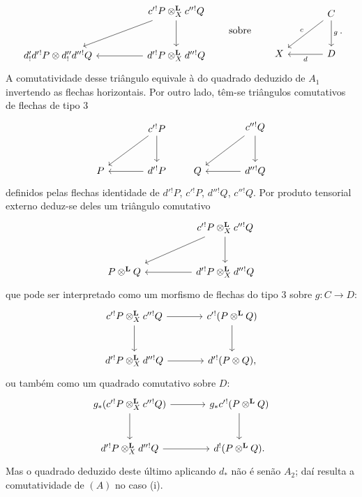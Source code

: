 \begin{prooftext}[Demonstração]
\[\begin{tikzcd}[column sep=huge,row sep=large]
& c'{}^!P\otimes_X^{\mathbf L}c''{}^!Q \arrow[d] \arrow[dl]\\
d'_!d'{}^!P\otimes d''_!d''{}^!Q &
d'{}^!P\otimes_X^{\mathbf L}d''{}^!Q\arrow[l]
\end{tikzcd}
\qquad\text{sobre}\qquad
\begin{tikzcd}[column sep=large,row sep=large]
& C\arrow[d,"g"]\arrow[dl,"c"']\\
X & D\arrow[l,"d"]
\end{tikzcd}.
\]
A comutatividade desse triângulo equivale à do quadrado deduzido de $A_1$ invertendo as flechas horizontais. Por outro lado, têm-se triângulos comutativos de flechas de tipo $3$
\[
\begin{tikzcd}[column sep=large,row sep=large]
& c'{}^!P \arrow[d]\arrow[dl]\\
P & d'{}^!P\arrow[l]
\end{tikzcd}
\qquad
\begin{tikzcd}[column sep=large,row sep=large]
& c''{}^!Q \arrow[d]\arrow[dl]\\
Q & d''{}^!Q\arrow[l]
\end{tikzcd}
\]
definidos pelas flechas identidade de $d'{}^!P$, $c'{}^!P$, $d''{}^!Q$, $c''{}^!Q$. Por produto tensorial externo deduz-se deles um triângulo comutativo
\[
\begin{tikzcd}[column sep=huge,row sep=large]
& c'{}^!P\otimes_X^{\mathbf L}c''{}^!Q \arrow[d]\arrow[dl]\\
P\otimes^{\mathbf L}Q & d'{}^!P\otimes_X^{\mathbf L}d''{}^!Q\arrow[l]
\end{tikzcd}
\]
que pode ser interpretado como um morfismo de flechas do tipo $3$ sobre $g:C\longrightarrow D$:
\[
\begin{tikzcd}[column sep=large,row sep=large]
c'{}^!P\otimes_X^{\mathbf L}c''{}^!Q \arrow[r]\arrow[d] &
c'{}^!(P\otimes^{\mathbf L}Q)\arrow[d]\\
d'{}^!P\otimes_X^{\mathbf L}d''{}^!Q \arrow[r] &
d'{}^!(P\otimes Q),
\end{tikzcd}
\]
ou também como um quadrado comutativo sobre $D$:
\[
\begin{tikzcd}[column sep=large,row sep=large]
g_*(c'{}^!P\otimes_X^{\mathbf L}c''{}^!Q) \arrow[r]\arrow[d] &
g_*c'{}^!(P\otimes^{\mathbf L}Q)\arrow[d]\\
d'{}^!P\otimes_X^{\mathbf L}d''{}^!Q \arrow[r] &
d^!(P\otimes^{\mathbf L}Q).
\end{tikzcd}
\]
Mas o quadrado deduzido deste último aplicando $d_*$ não é senão $A_2$; daí resulta a comutatividade de $(A)$ no caso (i).


\end{prooftext}
